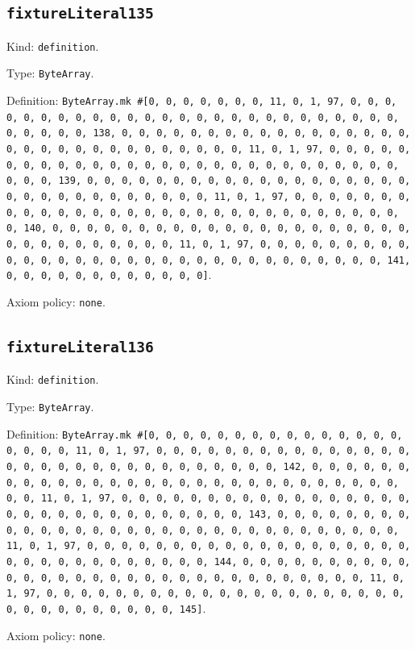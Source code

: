 \documentclass[11pt]{article}
\begin{document}
\subsection*{\texttt{fixtureLiteral135}}
\noindent Kind: \texttt{definition}.\par
\noindent Type: \texttt{ByteArray}.\par
\noindent Definition: \texttt{ByteArray.mk \#[0, 0, 0, 0, 0, 0, 0, 11, 0, 1, 97, 0, 0, 0, 0, 0, 0, 0, 0, 0, 0, 0, 0, 0, 0, 0, 0, 0, 0, 0, 0, 0, 0, 0, 0, 0, 0, 0, 0, 0, 0, 0, 138, 0, 0, 0, 0, 0, 0, 0, 0, 0, 0, 0, 0, 0, 0, 0, 0, 0, 0, 0, 0, 0, 0, 0, 0, 0, 0, 0, 0, 0, 0, 0, 11, 0, 1, 97, 0, 0, 0, 0, 0, 0, 0, 0, 0, 0, 0, 0, 0, 0, 0, 0, 0, 0, 0, 0, 0, 0, 0, 0, 0, 0, 0, 0, 0, 0, 0, 139, 0, 0, 0, 0, 0, 0, 0, 0, 0, 0, 0, 0, 0, 0, 0, 0, 0, 0, 0, 0, 0, 0, 0, 0, 0, 0, 0, 0, 0, 0, 0, 11, 0, 1, 97, 0, 0, 0, 0, 0, 0, 0, 0, 0, 0, 0, 0, 0, 0, 0, 0, 0, 0, 0, 0, 0, 0, 0, 0, 0, 0, 0, 0, 0, 0, 0, 140, 0, 0, 0, 0, 0, 0, 0, 0, 0, 0, 0, 0, 0, 0, 0, 0, 0, 0, 0, 0, 0, 0, 0, 0, 0, 0, 0, 0, 0, 0, 0, 11, 0, 1, 97, 0, 0, 0, 0, 0, 0, 0, 0, 0, 0, 0, 0, 0, 0, 0, 0, 0, 0, 0, 0, 0, 0, 0, 0, 0, 0, 0, 0, 0, 0, 0, 141, 0, 0, 0, 0, 0, 0, 0, 0, 0, 0, 0, 0]}.\par
\noindent Axiom policy: \texttt{none}.\par
\subsection*{\texttt{fixtureLiteral136}}
\noindent Kind: \texttt{definition}.\par
\noindent Type: \texttt{ByteArray}.\par
\noindent Definition: \texttt{ByteArray.mk \#[0, 0, 0, 0, 0, 0, 0, 0, 0, 0, 0, 0, 0, 0, 0, 0, 0, 0, 0, 11, 0, 1, 97, 0, 0, 0, 0, 0, 0, 0, 0, 0, 0, 0, 0, 0, 0, 0, 0, 0, 0, 0, 0, 0, 0, 0, 0, 0, 0, 0, 0, 0, 0, 0, 142, 0, 0, 0, 0, 0, 0, 0, 0, 0, 0, 0, 0, 0, 0, 0, 0, 0, 0, 0, 0, 0, 0, 0, 0, 0, 0, 0, 0, 0, 0, 0, 11, 0, 1, 97, 0, 0, 0, 0, 0, 0, 0, 0, 0, 0, 0, 0, 0, 0, 0, 0, 0, 0, 0, 0, 0, 0, 0, 0, 0, 0, 0, 0, 0, 0, 0, 143, 0, 0, 0, 0, 0, 0, 0, 0, 0, 0, 0, 0, 0, 0, 0, 0, 0, 0, 0, 0, 0, 0, 0, 0, 0, 0, 0, 0, 0, 0, 0, 11, 0, 1, 97, 0, 0, 0, 0, 0, 0, 0, 0, 0, 0, 0, 0, 0, 0, 0, 0, 0, 0, 0, 0, 0, 0, 0, 0, 0, 0, 0, 0, 0, 0, 0, 144, 0, 0, 0, 0, 0, 0, 0, 0, 0, 0, 0, 0, 0, 0, 0, 0, 0, 0, 0, 0, 0, 0, 0, 0, 0, 0, 0, 0, 0, 0, 0, 11, 0, 1, 97, 0, 0, 0, 0, 0, 0, 0, 0, 0, 0, 0, 0, 0, 0, 0, 0, 0, 0, 0, 0, 0, 0, 0, 0, 0, 0, 0, 0, 0, 0, 0, 145]}.\par
\noindent Axiom policy: \texttt{none}.\par
\end{document}
